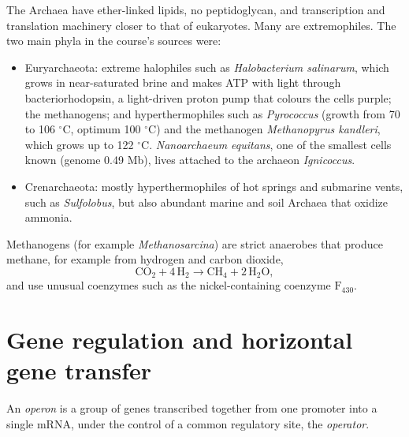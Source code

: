 The Archaea \cite[Chapter
19]{madigan2012brock} have ether-linked
lipids, no peptidoglycan, and transcription
and translation machinery closer to that of
eukaryotes. Many are extremophiles. The two
main phyla in the course's sources were:
\begin{itemize}
\item Euryarchaeota: extreme halophiles such
as \emph{Halobacterium salinarum}, which
grows in near-saturated brine and makes ATP
with light through bacteriorhodopsin, a
light-driven proton pump that colours the
cells purple; the methanogens; and
hyperthermophiles such as \emph{Pyrococcus}
(growth from 70 to 106 $^\circ$C, optimum 100
$^\circ$C) and the methanogen
\emph{Methanopyrus kandleri}, which grows up
to 122 $^\circ$C. \emph{Nanoarchaeum
equitans}, one of the smallest cells known
(genome 0.49 Mb), lives attached to the
archaeon \emph{Ignicoccus}.
\item Crenarchaeota: mostly hyperthermophiles
of hot springs and submarine vents, such as
\emph{Sulfolobus}, but also abundant marine
and soil Archaea that oxidize ammonia.
\end{itemize}
Methanogens (for example
\emph{Methanosarcina}) are strict anaerobes
that produce methane, for example from
hydrogen and carbon dioxide,
$$
\mathrm{CO_2} + 4\,\mathrm{H_2} \rightarrow
\mathrm{CH_4} + 2\,\mathrm{H_2O},
$$
and use unusual coenzymes such as the
nickel-containing coenzyme
$\mathrm{F_{430}}$.

\section{Gene regulation and horizontal gene
transfer}
\label{section-genetics}

\begin{definition}
\label{definition-operon}
An \emph{operon} is a group of genes
transcribed together from one promoter into a
single mRNA, under the control of a common
regulatory site, the \emph{operator}.
\end{definition}

